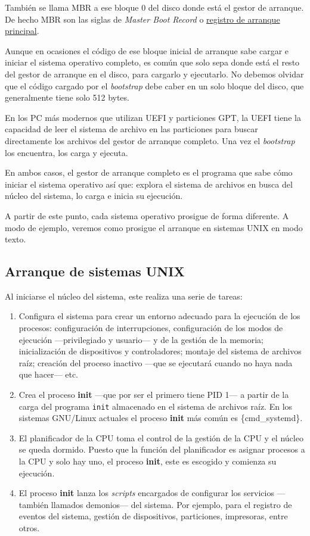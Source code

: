 También se llama {}MBR a ese bloque 0 del disco donde está el gestor de
arranque. De hecho MBR son las siglas de \emph{Master Boot Record} o
\href{https://es.wikipedia.org/wiki/Registro_de_arranque_principal}{registro
de arranque principal}.

Aunque en ocasiones el código de ese bloque inicial de arranque sabe
cargar e iniciar el sistema operativo completo, es común que solo sepa
donde está el resto del gestor de arranque en el disco, para cargarlo y
ejecutarlo. No debemos olvidar que el código cargado por el
\emph{bootstrap} debe caber en un solo bloque del disco, que
generalmente tiene solo 512 bytes.

En los PC más modernos que utilizan UEFI y particiones GPT, la UEFI
tiene la capacidad de leer el sistema de archivo en las particiones para
buscar directamente los archivos del gestor de arranque completo. Una
vez el \emph{bootstrap} los encuentra, los carga y ejecuta.

En ambos casos, el gestor de arranque completo es el programa que sabe
cómo iniciar el sistema operativo así que: explora el sistema de
archivos en busca del núcleo del sistema, lo carga e inicia su
ejecución.

A partir de este punto, cada sistema operativo prosigue de forma
diferente. A modo de ejemplo, veremos como prosigue el arranque en
sistemas UNIX en modo texto.

\subsection{Arranque de sistemas UNIX}\label{_arranque_de_sistemas_unix}

Al iniciarse el núcleo del sistema, este realiza una serie de tareas:

\begin{enumerate}
\def\labelenumi{\arabic{enumi}.}
\item
  Configura el sistema para crear un entorno adecuado para la ejecución
  de los procesos: configuración de interrupciones, configuración de los
  modos de ejecución ---privilegiado y usuario--- y de la gestión de la
  memoria; inicialización de dispositivos y controladores; montaje del
  sistema de archivos raíz; creación del proceso inactivo ---que se
  ejecutará cuando no haya nada que hacer--- etc.
\item
  Crea el proceso \textbf{{}init} ---que por ser el primero tiene PID
  1--- a partir de la carga del programa \texttt{init} almacenado en el
  sistema de archivos raíz. En los sistemas GNU/Linux actuales el
  proceso \textbf{init} más común es \{cmd\_systemd\}.
\item
  El planificador de la CPU toma el control de la gestión de la CPU y el
  núcleo se queda dormido. Puesto que la función del planificador es
  asignar procesos a la CPU y solo hay uno, el proceso \textbf{init},
  este es escogido y comienza su ejecución.
\item
  El proceso \textbf{init} lanza los \emph{scripts} encargados de
  configurar los servicios ---también llamados demonios--- del sistema.
  Por ejemplo, para el registro de eventos del sistema, gestión de
  dispositivos, particiones, impresoras, entre otros.
\end{enumerate}

